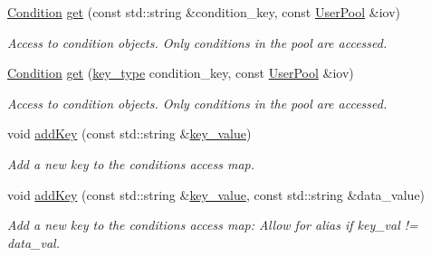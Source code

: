 \begin{DoxyCompactItemize}
\hyperlink{class_d_d4hep_1_1_conditions_1_1_condition}{Condition} \hyperlink{class_d_d4hep_1_1_conditions_1_1_interna_1_1_condition_container_ac57daede261d963debdb5806bb155f8d}{get} (const std\+::string \&condition\+\_\+key, const \hyperlink{class_d_d4hep_1_1_conditions_1_1_user_pool}{User\+Pool} \&iov)
\begin{DoxyCompactList}\small\item\em Access to condition objects. Only conditions in the pool are accessed. \end{DoxyCompactList}\item 
\hyperlink{class_d_d4hep_1_1_conditions_1_1_condition}{Condition} \hyperlink{class_d_d4hep_1_1_conditions_1_1_interna_1_1_condition_container_a90e9c820b464a25d242823b7a0786a6a}{get} (\hyperlink{class_d_d4hep_1_1_conditions_1_1_interna_1_1_condition_container_a7a4545b4b0536565feb7346bd97c63fa}{key\+\_\+type} condition\+\_\+key, const \hyperlink{class_d_d4hep_1_1_conditions_1_1_user_pool}{User\+Pool} \&iov)
\begin{DoxyCompactList}\small\item\em Access to condition objects. Only conditions in the pool are accessed. \end{DoxyCompactList}\item 
void \hyperlink{class_d_d4hep_1_1_conditions_1_1_interna_1_1_condition_container_ab736d477be5f0407bb0ad663e2e7401b}{add\+Key} (const std\+::string \&\hyperlink{class_d_d4hep_1_1_conditions_1_1_interna_1_1_condition_container_a2a8452e68d48eb94553607e7d7ae13f6}{key\+\_\+value})
\begin{DoxyCompactList}\small\item\em Add a new key to the conditions access map. \end{DoxyCompactList}\item 
void \hyperlink{class_d_d4hep_1_1_conditions_1_1_interna_1_1_condition_container_aaff72767a947def90f6e9b16befca08d}{add\+Key} (const std\+::string \&\hyperlink{class_d_d4hep_1_1_conditions_1_1_interna_1_1_condition_container_a2a8452e68d48eb94553607e7d7ae13f6}{key\+\_\+value}, const std\+::string \&data\+\_\+value)
\begin{DoxyCompactList}\small\item\em Add a new key to the conditions access map\+: Allow for alias if key\+\_\+val != data\+\_\+val. \end{DoxyCompactList}\end{DoxyCompactItemize}
